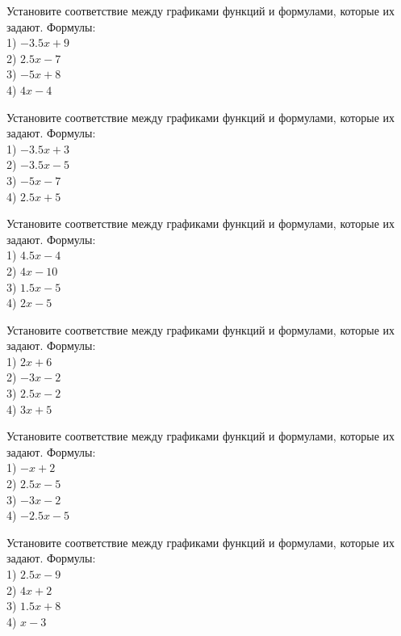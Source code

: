 \documentclass[4apaper]{article}
\begin{document}
\begin{taskBN}{31}
Установите соответствие между графиками функций и формулами, которые их задают. Формулы: \\1) $-3.5x+9$\\2) $2.5x-7$\\3) $-5x+8$\\4) $4x-4$
\end{taskBN}

\begin{taskBN}{32}
Установите соответствие между графиками функций и формулами, которые их задают. Формулы: \\1) $-3.5x+3$\\2) $-3.5x-5$\\3) $-5x-7$\\4) $2.5x+5$
\end{taskBN}

\begin{taskBN}{33}
Установите соответствие между графиками функций и формулами, которые их задают. Формулы: \\1) $4.5x-4$\\2) $4x-10$\\3) $1.5x-5$\\4) $2x-5$
\end{taskBN}

\begin{taskBN}{34}
Установите соответствие между графиками функций и формулами, которые их задают. Формулы: \\1) $2x+6$\\2) $-3x-2$\\3) $2.5x-2$\\4) $3x+5$
\end{taskBN}

\begin{taskBN}{35}
Установите соответствие между графиками функций и формулами, которые их задают. Формулы: \\1) $-x+2$\\2) $2.5x-5$\\3) $-3x-2$\\4) $-2.5x-5$
\end{taskBN}

\begin{taskBN}{36}
Установите соответствие между графиками функций и формулами, которые их задают. Формулы: \\1) $2.5x-9$\\2) $4x+2$\\3) $1.5x+8$\\4) $x-3$
\end{taskBN}
\end{document}
